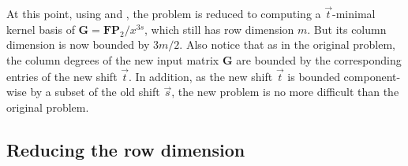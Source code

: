 At this point, using 
and , the problem
is reduced to computing a $\vec{t}$-minimal kernel basis of $\mathbf{G}=\mathbf{F}\mathbf{P}_{2}/x^{3s}$,
which still has row dimension $m$. But its column dimension is now
bounded by $3m/2$. Also notice that as in the original problem, the
column degrees of the new input matrix $\mathbf{G}$ are bounded by
the corresponding entries of the new shift $\vec{t}$. In addition,
as the new shift $\vec{t}$ is bounded component-wise by a subset
of the old shift $\vec{s}$, the new problem is no more difficult
than the original problem.


\subsection{\label{sub:continueComputingNullspaceBasisByRows}Reducing the row
dimension }

